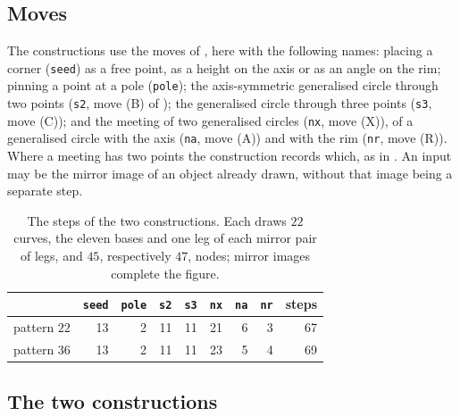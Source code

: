 \documentclass[11pt,a4paper]{article}
\theoremstyle{definition}
\theoremstyle{remark}
\begin{document}
\subsection{Moves}
The constructions use the moves of \cite[\S4.2]{CK}, here with the following names: placing a corner
(\texttt{seed}) as a free point, as a height on the axis or as an angle on the rim; pinning a point at a
pole (\texttt{pole}); the axis-symmetric generalised circle through two points (\texttt{s2}, move (B) of
\cite{CK}); the generalised circle through three points (\texttt{s3}, move (C)); and the meeting of two
generalised circles (\texttt{nx}, move (X)), of a generalised circle with the axis (\texttt{na}, move (A))
and with the rim (\texttt{nr}, move (R)). Where a meeting has two points the construction records which,
as in \cite{CK}. An input may be the mirror image of an object already drawn, without that image being a
separate step.

\begin{table}[h]
\centering\small
\begin{tabular}{@{}lrrrrrrrr@{}}
\toprule
& \texttt{seed} & \texttt{pole} & \texttt{s2} & \texttt{s3} & \texttt{nx} & \texttt{na} & \texttt{nr} &
steps \\ \midrule
pattern $22$ & 13 & 2 & 11 & 11 & 21 & 6 & 3 & 67 \\
pattern $36$ & 13 & 2 & 11 & 11 & 23 & 5 & 4 & 69 \\ \bottomrule
\end{tabular}
\caption{The steps of the two constructions. Each draws $22$ curves, the eleven bases and one leg of each
mirror pair of legs, and $45$, respectively $47$, nodes; mirror images complete the figure.}
\label{tab:steps}
\end{table}

\subsection{The two constructions}


\end{document}
